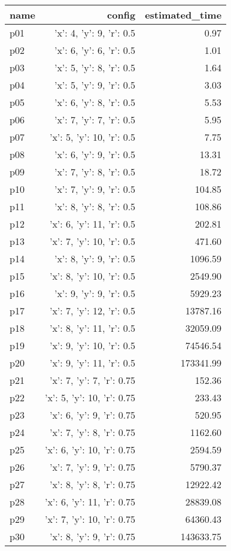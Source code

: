 \documentclass{article}
\begin{document}
                            \begin{center}
                            \scriptsize
                            \begin{tabular}{@{}l|r|r@{}}
                            name & config & estimated\_time\\\midrule
                              p01&{'x': 4, 'y': 9, 'r': 0.5}&0.97\\
  p02&{'x': 6, 'y': 6, 'r': 0.5}&1.01\\
  p03&{'x': 5, 'y': 8, 'r': 0.5}&1.64\\
  p04&{'x': 5, 'y': 9, 'r': 0.5}&3.03\\
  p05&{'x': 6, 'y': 8, 'r': 0.5}&5.53\\
  p06&{'x': 7, 'y': 7, 'r': 0.5}&5.95\\
  p07&{'x': 5, 'y': 10, 'r': 0.5}&7.75\\
  p08&{'x': 6, 'y': 9, 'r': 0.5}&13.31\\
  p09&{'x': 7, 'y': 8, 'r': 0.5}&18.72\\
  p10&{'x': 7, 'y': 9, 'r': 0.5}&104.85\\
  p11&{'x': 8, 'y': 8, 'r': 0.5}&108.86\\
  p12&{'x': 6, 'y': 11, 'r': 0.5}&202.81\\
  p13&{'x': 7, 'y': 10, 'r': 0.5}&471.60\\
  p14&{'x': 8, 'y': 9, 'r': 0.5}&1096.59\\
  p15&{'x': 8, 'y': 10, 'r': 0.5}&2549.90\\
  p16&{'x': 9, 'y': 9, 'r': 0.5}&5929.23\\
  p17&{'x': 7, 'y': 12, 'r': 0.5}&13787.16\\
  p18&{'x': 8, 'y': 11, 'r': 0.5}&32059.09\\
  p19&{'x': 9, 'y': 10, 'r': 0.5}&74546.54\\
  p20&{'x': 9, 'y': 11, 'r': 0.5}&173341.99\\
  p21&{'x': 7, 'y': 7, 'r': 0.75}&152.36\\
  p22&{'x': 5, 'y': 10, 'r': 0.75}&233.43\\
  p23&{'x': 6, 'y': 9, 'r': 0.75}&520.95\\
  p24&{'x': 7, 'y': 8, 'r': 0.75}&1162.60\\
  p25&{'x': 6, 'y': 10, 'r': 0.75}&2594.59\\
  p26&{'x': 7, 'y': 9, 'r': 0.75}&5790.37\\
  p27&{'x': 8, 'y': 8, 'r': 0.75}&12922.42\\
  p28&{'x': 6, 'y': 11, 'r': 0.75}&28839.08\\
  p29&{'x': 7, 'y': 10, 'r': 0.75}&64360.43\\
  p30&{'x': 8, 'y': 9, 'r': 0.75}&143633.75
                            \end{tabular}
                            \end{center}
                    
\end{document}
